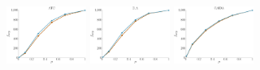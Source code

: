 \documentclass[a4paper]{report}
\newcommand{\wratio}{0.195}
\begin{document}
\includegraphics[width=\wratio\textwidth]{influence/ATC/fs_atc}\hfill
\includegraphics[width=\wratio\textwidth]{influence/B_A/fs_b_a}\hfill
\includegraphics[width=\wratio\textwidth]{influence/CAIDA/fs_caida}\hfill
\end{document}
